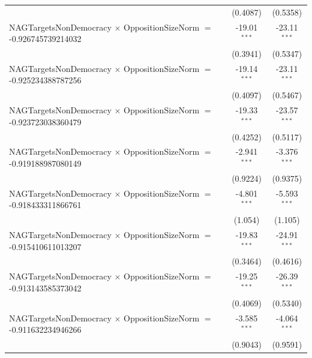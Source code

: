 \begin{tabular}{lcc}
                                                                                & (0.4087)             & (0.5358)\\   
   NAGTargetsNonDemocracy $\times$ OppositionSizeNorm $=$ -0.926745739214032    & -19.01$^{***}$       & -23.11$^{***}$\\   
                                                                                & (0.3941)             & (0.5347)\\   
   NAGTargetsNonDemocracy $\times$ OppositionSizeNorm $=$ -0.925234388787256    & -19.14$^{***}$       & -23.11$^{***}$\\   
                                                                                & (0.4097)             & (0.5467)\\   
   NAGTargetsNonDemocracy $\times$ OppositionSizeNorm $=$ -0.923723038360479    & -19.33$^{***}$       & -23.57$^{***}$\\   
                                                                                & (0.4252)             & (0.5117)\\   
   NAGTargetsNonDemocracy $\times$ OppositionSizeNorm $=$ -0.919188987080149    & -2.941$^{***}$       & -3.376$^{***}$\\   
                                                                                & (0.9224)             & (0.9375)\\   
   NAGTargetsNonDemocracy $\times$ OppositionSizeNorm $=$ -0.918433311866761    & -4.801$^{***}$       & -5.593$^{***}$\\   
                                                                                & (1.054)              & (1.105)\\   
   NAGTargetsNonDemocracy $\times$ OppositionSizeNorm $=$ -0.915410611013207    & -19.83$^{***}$       & -24.91$^{***}$\\   
                                                                                & (0.3464)             & (0.4616)\\   
   NAGTargetsNonDemocracy $\times$ OppositionSizeNorm $=$ -0.913143585373042    & -19.25$^{***}$       & -26.39$^{***}$\\   
                                                                                & (0.4069)             & (0.5340)\\   
   NAGTargetsNonDemocracy $\times$ OppositionSizeNorm $=$ -0.911632234946266    & -3.585$^{***}$       & -4.064$^{***}$\\   
                                                                                & (0.9043)             & (0.9591)\\   

\end{tabular}
